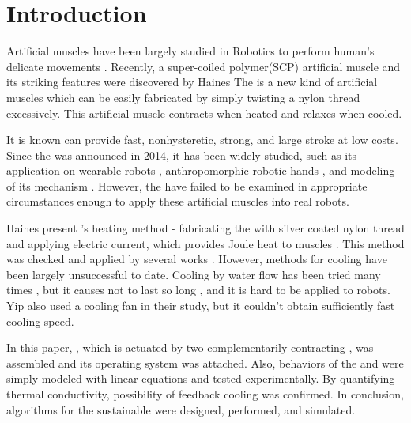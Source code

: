 
\section{Introduction}
Artificial muscles have been largely studied in Robotics to perform human's delicate movements \cite{ashley}. Recently, a super-coiled polymer(SCP) artificial muscle and its striking features were discovered by Haines \etal \cite{haines} The \scp is a new kind of artificial muscles which can be easily fabricated by simply twisting a nylon thread excessively. This artificial muscle contracts when heated and relaxes when cooled.

It is known \scps can provide fast, nonhysteretic, strong, and large stroke at low costs\cite{yuan, mirvakili, madden}. 
Since the \scp was announced in 2014, it has been widely studied, such as its application on
wearable robots \cite{sphincter, kianzad2}, 
anthropomorphic robotic hands \cite{yip, finger}, 
and modeling of its mechanism \cite{treatise, torsional, youngmodulus, fab_coil, multiscale, healing, kianzad, moretti}. 
However, the \scps have failed to be examined in appropriate circumstances enough to apply these artificial muscles into real robots.

Haines \etal present \scp 's heating method - fabricating the \scps with silver coated nylon thread and applying electric current, which provides Joule heat to muscles \cite{haines}. This method was checked and applied by several works \cite{yip, mirvakili,kianzad,sphincter,kianzad2}. However, methods for cooling \scps have been largely unsuccessful to date. 
Cooling by water flow has been tried many times \cite{haines,finger},
but it causes \scps not to last so long \cite{haines},
and it is hard to be applied to robots. 
Yip \etal also used a cooling fan in their study, but it couldn't obtain sufficiently fast cooling speed.

In this paper, \antanospace, which is actuated by two complementarily contracting \scpsnospace, was assembled and its operating system was attached. Also, behaviors of the \scps and \anta were simply modeled with linear equations and tested experimentally. By quantifying thermal conductivity, possibility of feedback cooling was confirmed. In conclusion, algorithms for the sustainable \apc were designed, performed, and simulated.